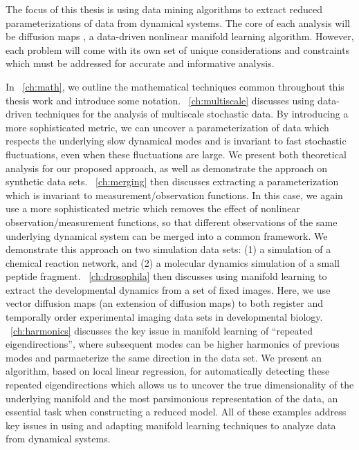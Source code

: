 The focus of this thesis is using data mining algorithms to extract reduced parameterizations of data from dynamical systems.
%
The core of each analysis will be diffusion maps \citep{Coifman2006}, a data-driven nonlinear manifold learning algorithm. 
%
However, each problem will come with its own set of unique considerations and constraints which must be addressed for accurate and informative analysis. 

In \chap~\ref{ch:math}, we outline the mathematical techniques common throughout this thesis work and introduce some notation. 
%
\chap~\ref{ch:multiscale} discusses using data-driven techniques for the analysis of multiscale stochastic data. 
%
By introducing a more sophisticated metric, we can uncover a parameterization of data which respects the underlying slow dynamical modes and is invariant to fast stochastic fluctuations, even when these fluctuations are large. 
%
We present both theoretical analysis for our proposed approach, as well as demonstrate the approach on synthetic data sets. 
%
\chap~\ref{ch:merging} then discusses extracting a parameterization which is invariant to measurement/observation functions. 
%
In this case, we again use a more sophisticated metric which removes the effect of nonlinear observation/measurement functions, so that different observations of the same underlying dynamical system can be merged into a common framework. 
%
We demonstrate this approach on two simulation data sets: (1) a simulation of a chemical reaction network, and (2) a molecular dynamics simulation of a small peptide fragment.
%
\chap~\ref{ch:drosophila} then discusses using manifold learning to extract the developmental dynamics from a set of fixed images. 
%
Here, we use vector diffusion maps (an extension of diffusion maps) to both register and temporally order experimental imaging data sets in developmental biology. 
%
\chap~\ref{ch:harmonics} discusses the key issue in manifold learning of ``repeated eigendirections'', where subsequent modes can be higher harmonics of previous modes and parmaeterize the same direction in the data set. 
%
We present an algorithm, based on local linear regression, for automatically detecting these repeated eigendirections which allows us to uncover the true dimensionality of the underlying manifold and the most parsimonious representation of the data, an essential task when constructing a reduced model.
%
All of these examples address key issues in using and adapting manifold learning techniques to analyze data from dynamical systems.